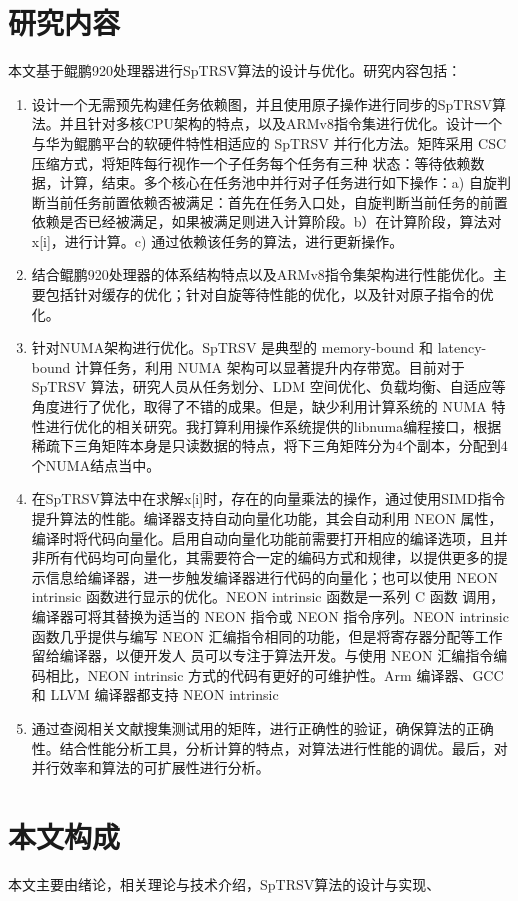 \section{研究内容}

本文基于鲲鹏920处理器进行SpTRSV算法的设计与优化。研究内容包括：

\begin{enumerate} \setlength{\itemsep}{0pt}
    \item 设计一个无需预先构建任务依赖图，并且使用原子操作进行同步的SpTRSV算法。并且针对多核CPU架构的特点，以及ARMv8指令集进行优化。设计一个与华为鲲鹏平台的软硬件特性相适应的 SpTRSV 并行化方法。矩阵采用 CSC 压缩方式，将矩阵每行视作一个子任务每个任务有三种 状态：等待依赖数据，计算，结束。多个核心在任务池中并行对子任务进行如下操作：a) 自旋判断当前任务前置依赖否被满足：首先在任务入口处，自旋判断当前任务的前置依赖是否已经被满足，如果被满足则进入计算阶段。b）在计算阶段，算法对x[i]，进行计算。c) 通过依赖该任务的算法，进行更新操作。
    \item 结合鲲鹏920处理器的体系结构特点以及ARMv8指令集架构进行性能优化。主要包括针对缓存的优化；针对自旋等待性能的优化，以及针对原子指令的优化。
    \item 针对NUMA架构进行优化。SpTRSV 是典型的 memory-bound 和 latency-bound 计算任务，利用 NUMA 架构可以显著提升内存带宽。目前对于 SpTRSV 算法，研究人员从任务划分、LDM 空间优化、负载均衡、自适应等角度进行了优化，取得了不错的成果。但是，缺少利用计算系统的 NUMA 特性进行优化的相关研究。我打算利用操作系统提供的libnuma编程接口，根据稀疏下三角矩阵本身是只读数据的特点，将下三角矩阵分为4个副本，分配到4个NUMA结点当中。
    \item 在SpTRSV算法中在求解x[i]时，存在的向量乘法的操作，通过使用SIMD指令提升算法的性能。编译器支持自动向量化功能，其会自动利用 NEON 属性，编译时将代码向量化。启用自动向量化功能前需要打开相应的编译选项，且并非所有代码均可向量化，其需要符合一定的编码方式和规律，以提供更多的提示信息给编译器，进一步触发编译器进行代码的向量化；也可以使用 NEON intrinsic 函数进行显示的优化。NEON intrinsic 函数是一系列 C 函数 调用，编译器可将其替换为适当的 NEON 指令或 NEON 指令序列。NEON intrinsic 函数几乎提供与编写 NEON 汇编指令相同的功能，但是将寄存器分配等工作留给编译器，以便开发人 员可以专注于算法开发。与使用 NEON 汇编指令编码相比，NEON intrinsic 方式的代码有更好的可维护性。Arm 编译器、GCC 和 LLVM 编译器都支持 NEON intrinsic
    \item 通过查阅相关文献搜集测试用的矩阵，进行正确性的验证，确保算法的正确性。结合性能分析工具，分析计算的特点，对算法进行性能的调优。最后，对并行效率和算法的可扩展性进行分析。
\end{enumerate}

\section{本文构成}

本文主要由绪论，相关理论与技术介绍，SpTRSV算法的设计与实现、

\endinput
